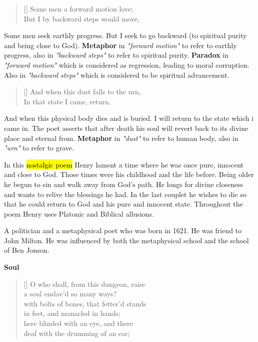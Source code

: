 \begin{verse}[\versewidth]
{\fontverse
Some men a forward motion love;\\
But I by backward steps would move,
} 
\end{verse}

Some men seek earthly progress. But I seek to go backward (to spiritual purity
and being close to God). \textbf{Metaphor} in \textit{"forward motion"} 
to refer to earthly progress, also in \textit{"backward steps"} to refer 
to spiritual purity. \textbf{Paradox} in 
\textit{"forward motion"} which is considered as regression, leading to moral corruption. Also
in \textit{"backward steps"} which is considered to be spiritual advancement.

\begin{verse}[\versewidth]
{\fontverse
And when this dust falls to the urn,\\
In that state I came, return.
} 
\end{verse}

And when this physical body dies and is buried. I will return to the state 
which i came in. The poet asserts that after death his soul will revert back
to its divine place and eternal from. \textbf{Metaphor} in \textit{"dust"} 
to refer to human body, also in \textit{"urn"} to refer to grave. 


In this \hl{nostalgic poem} Henry lament a time where he was once pure, innocent and close to God.
Those times were his childhood and the life before. Being older he begun to sin
and walk away from God's path. He longs for divine closeness and wants to relive the blessings he had.
In the last couplet he wishes to die so that  he could return to God and his
pure and innocent state. Throughout the poem Henry uses Platonic and Biblical allusions.


A politician and a metaphysical poet who was born in 1621. He was 
friend to John Milton. He was influenced by both the 
metaphysical school and the school of Ben Jonson.

\newpage
{}
\settowidth{\versewidth}{O who shall, from this dungeon, raise }
\centerline{\textbf{\large{Soul}}}
\begin{verse}[\versewidth]
{\fontverse
O who shall, from this dungeon, raise\\
a soul enslav’d so many ways?\\
with bolts of bones, that fetter’d stands\\
in feet, and manacled in hands;\\
here blinded with an eye, and there\\
deaf with the drumming of an ear;
} 
\end{verse}

